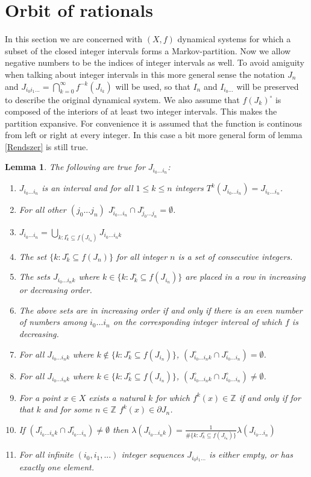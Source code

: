 \documentclass{article}
\newtheorem{lemma}[theorem]{Lemma}
\begin{document}
\section{Orbit of rationals}

In this section we are concerned with $(X, f)$ dynamical systems for which a subset of the closed integer intervals forms a Markov-partition. Now we allow negative numbers to be the indices of integer intervals as well. To avoid amiguity when talking about integer intervals in this more general sense the notation $J_n$ and $J_{i_0i_1...} = \bigcap_{k=0}^{\infty}f^{-k}(J_{i_k})$ will be used, so that $I_n$ and $I_{i_0...}$ will be preserved to describe the original dynamical system. We also assume that $f(J_k)^\circ$ is composed of the interiors of at least two integer intervals. This makes the partition expansive. For convenience it is assumed that the function is continous from left or right at every integer. In this case a bit more general form of lemma \ref{Rendszer} is still true.

\begin{lemma} \label{Rendszer3}
The following are true for $J_{i_0...i_n}$:
\begin{enumerate}
\item $J_{i_0...i_n}$ is an interval and for all $1 \leq k\leq n$ integers $T^k(J_{i_0...i_n}) = J_{i_k...i_n}$.
\item For all other $(j_0...j_n)$ $J_{i_0...i_n}^\circ \cap J_{j_0...j_n}^\circ = \emptyset$.
\item $J_{i_0...i_n} = \bigcup_{k: I_k^\circ \subseteq f(J_{i_n})} J_{i_0...i_nk}$
\item The set $\{k: J_k^\circ \subseteq f(J_{n})\}$ for all integer $n$ is a set of consecutive integers.
\item The sets $J_{i_0...i_nk}$ where $k \in \{k: J_k^\circ \subseteq f(J_{i_n})\}$ are placed in a row in increasing or decreasing order.
\item The above sets are in increasing order if and only if there is an even number of numbers among $i_0 ... i_n$ on the corresponding integer interval of which $f$ is decreasing.
\item For all $J_{i_0...i_nk}$ where $k \notin \{k: J_k^\circ \subseteq f(J_{i_n})\}$, $( J_{i_0...i_nk}^\circ \cap J_{i_0...i_n}^\circ ) = \emptyset$.
\item For all $J_{i_0...i_nk}$ where $k \in \{k: J_k^\circ \subseteq f(J_{i_n})\}$, $( J_{i_0...i_nk}^\circ \cap J_{i_0...i_n}^\circ ) \neq \emptyset$.
\item For a point $x \in X$ exists a natural $k$ for which $f^k(x)\in \mathbb{Z}$ if and only if for that $k$ and for some $n\in \mathbb{Z}$ $f^k(x) \in \partial J_n$.
\item If $( J_{i_0...i_nk}^\circ \cap J_{i_0...i_n}^\circ ) \neq \emptyset$ then $\lambda(J_{i_0...i_nk}) = \frac{1}{\#\{k: J_k^\circ \subseteq f(J_{i_n})\}} \lambda(J_{i_0...i_n})$
\item For all infinite $(i_0, i_1, ...)$ integer sequences $J_{i_0i_1...}$ is either empty, or has exactly one element.
\end{enumerate}
\end{lemma}
\end{document}
